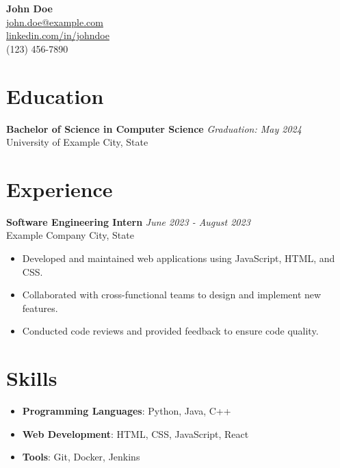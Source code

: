 \documentclass[a4paper,10pt]{article}
\begin{document}
\begin{center}
    \textbf{\Huge{John Doe}} \\
    \vspace{2mm}
    \href{mailto:john.doe@example.com}{john.doe@example.com} \\
    \href{https://www.linkedin.com/in/johndoe}{linkedin.com/in/johndoe} \\
    (123) 456-7890
\end{center}

\vspace{5mm}

\section*{Education}
\noindent
\textbf{Bachelor of Science in Computer Science} \hfill \textit{Graduation: May 2024}\\
University of Example \hfill City, State\\

\section*{Experience}
\noindent
\textbf{Software Engineering Intern} \hfill \textit{June 2023 - August 2023}\\
Example Company \hfill City, State\\
\begin{itemize}[leftmargin=0.15in]
    \item Developed and maintained web applications using JavaScript, HTML, and CSS.
    \item Collaborated with cross-functional teams to design and implement new features.
    \item Conducted code reviews and provided feedback to ensure code quality.
\end{itemize}

\section*{Skills}
\begin{itemize}[leftmargin=0.15in]
    \item \textbf{Programming Languages}: Python, Java, C++
    \item \textbf{Web Development}: HTML, CSS, JavaScript, React
    \item \textbf{Tools}: Git, Docker, Jenkins
\end{itemize}
\end{document}
